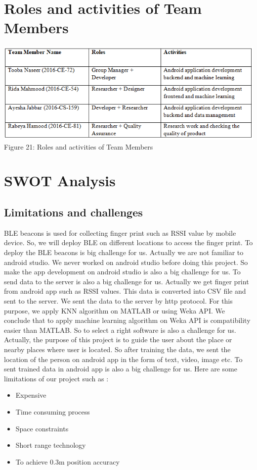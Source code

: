 \documentclass{article}
\begin{document}
\section{Roles and activities of Team Members}
\begin{center}
\includegraphics[scale=0.8]{table5}
\\Figure 21: Roles and activities of Team Members
\end{center}
\section{SWOT Analysis}
\subsection{Limitations and challenges}
BLE beacons is used for collecting finger print such as RSSI value by mobile device. So, we will deploy BLE on different locations to access the finger print. To deploy the BLE beacons is big  challenge for us.
Actually we are not familiar to android studio. We never worked on android studio before doing this project. So make the app development on android studio is also a big challenge for us. 
To send data to the server is also a big challenge for us. Actually we get finger print from android app such as RSSI values. This data is converted into CSV file and sent to the server. We sent the data to the server by http protocol. 
For this purpose, we apply KNN algorithm on MATLAB or using Weka API. We conclude that to apply machine learning algorithm on Weka API is compatibility easier than MATLAB. So to select a right software is also a challenge for us. 
Actually, the purpose of this project is to guide the user about the place or nearby places where user is located. So after training the data, we sent the location of the person on android app in the form of text, video, image etc. To sent trained data in android app is also a big challenge for us. 
Here are some limitations of our project such as : 
\begin{itemize}
\item Expensive
\item Time consuming process
\item Space constraints
\item Short range technology
\item To achieve 0.3m position accuracy
\end{itemize}
\end{document}
